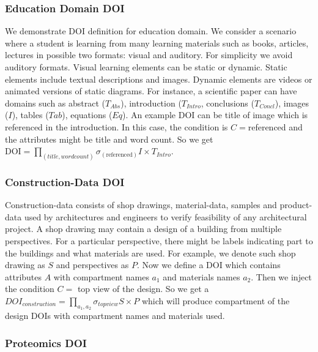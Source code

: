 \subsubsection{Education Domain DOI}
We demonstrate DOI definition for education domain. We consider a scenario where a student is learning from many learning materials such as books, articles, lectures in possible two formats: visual and auditory. For simplicity we avoid auditory formats. Visual learning elements can be static or dynamic. Static elements include textual descriptions and images. Dynamic elements are videos or animated versions of static diagrams. For instance, a scientific paper can have domains such as abstract ($T_{Abs}$), introduction ($T_{Intro}$, conclusions ($T_{Concl}$), images ($I$), tables ($Tab$), equations ($Eq$). An example DOI can be title of image which is referenced in the introduction. In this case, the condition is $C=$referenced and the attributes might be title and word count. So we get $\text{DOI} = \prod_{(title, wordcount)} \sigma_{(\text{referenced})} I \times T_{Intro}$. 

\subsubsection{Construction-Data DOI}
Construction-data consists of shop drawings, material-data, samples and product-data used by architectures and engineers to verify feasibility of any architectural project. A shop drawing may contain a design of a building from multiple perspectives. For a particular perspective, there might be labels indicating part to the buildings and what materials are used. For example, we denote such shop drawing as $S$ and perspectives as $P$. Now we define a DOI which contains attributes $A$ with compartment names $a_1$ and materials names $a_2$. Then we inject the condition $C=$ top view of the design. So we get a $DOI_{construction} = \prod_{a_1,a_2} \sigma_{topview} S \times P$ which will produce compartment of the design DOIs with compartment names and materials used. 

\subsubsection{Proteomics DOI}


